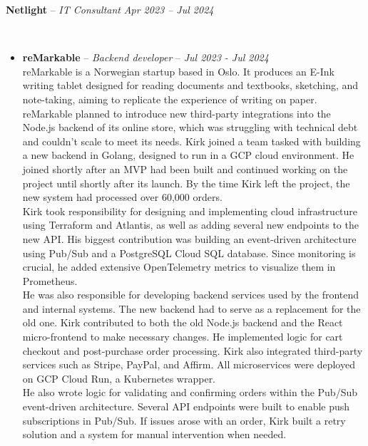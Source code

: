 \documentclass[10pt,letterpaper]{article}
\begin{document}
\headedsection
{\textbf{Netlight} -- \textit{IT Consultant}}
{\textit{Apr 2023 -- Jul 2024}} { \\
	\begin{itemize}[noitemsep,nolistsep]
		\item \textbf{reMarkable} -- {\it Backend developer} -- {\it Jul 2023 - Jul 2024} \\
			reMarkable is a Norwegian startup based in Oslo. It produces an E-Ink writing tablet designed for reading documents and textbooks, sketching, and note-taking, aiming to replicate the experience of writing on paper. \\

			reMarkable planned to introduce new third-party integrations into the Node.js backend of its online store, which was struggling with technical debt and couldn't scale to meet its needs. Kirk joined a team tasked with building a new backend in Golang, designed to run in a GCP cloud environment. He joined shortly after an MVP had been built and continued working on the project until shortly after its launch. By the time Kirk left the project, the new system had processed over 60,000 orders. \\

			Kirk took responsibility for designing and implementing cloud infrastructure using Terraform and Atlantis, as well as adding several new endpoints to the new API. His biggest contribution was building an event-driven architecture using Pub/Sub and a PostgreSQL Cloud SQL database. Since monitoring is crucial, he added extensive OpenTelemetry metrics to visualize them in Prometheus. \\

			He was also responsible for developing backend services used by the frontend and internal systems. The new backend had to serve as a replacement for the old one. Kirk contributed to both the old Node.js backend and the React micro-frontend to make necessary changes. He implemented logic for cart checkout and post-purchase order processing. Kirk also integrated third-party services such as Stripe, PayPal, and Affirm. All microservices were deployed on GCP Cloud Run, a Kubernetes wrapper. \\

			He also wrote logic for validating and confirming orders within the Pub/Sub event-driven architecture. Several API endpoints were built to enable push subscriptions in Pub/Sub. If issues arose with an order, Kirk built a retry solution and a system for manual intervention when needed. \\


\end{itemize}}
\end{document}
